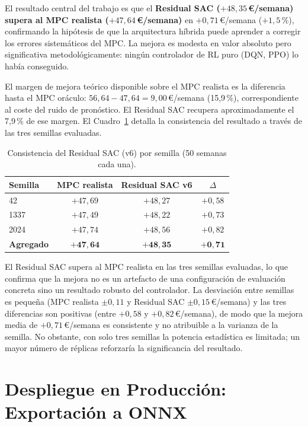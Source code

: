 \documentclass[12pt, a4paper, twoside]{report}
\begin{document}
El resultado central del trabajo es que el \textbf{Residual SAC
($+48{,}35$\,€/semana) supera al MPC realista ($+47{,}64$\,€/semana)} en
$+0{,}71$\,€/semana ($+1{,}5\,\%$), confirmando la hipótesis de que la
arquitectura híbrida
puede aprender a corregir los errores sistemáticos del MPC. La mejora es
modesta en valor absoluto pero significativa metodológicamente: ningún
controlador de RL puro (DQN, PPO) lo había conseguido.

El margen de mejora teórico disponible sobre el MPC realista es la diferencia
hasta el MPC oráculo: $56{,}64 - 47{,}64 = 9{,}00$\,€/semana (15{,}9\,\%),
correspondiente al coste del ruido de pronóstico. El Residual SAC recupera
aproximadamente el 7{,}9\,\% de ese margen. El Cuadro~\ref{tab:seeds} detalla la
consistencia del resultado a través de las tres semillas evaluadas.

\begin{table}[H]
\centering
\caption{Consistencia del Residual SAC (v6) por semilla (50 semanas cada una).}
\label{tab:seeds}
\begin{tabular}{lccc}
\toprule
\textbf{Semilla} & \textbf{MPC realista} & \textbf{Residual SAC v6} &
\textbf{$\Delta$} \\
\midrule
42 & $+47{,}69$ & $+48{,}27$ & $+0{,}58$ \\
1337 & $+47{,}49$ & $+48{,}22$ & $+0{,}73$ \\
2024 & $+47{,}74$ & $+48{,}56$ & $+0{,}82$ \\
\midrule
\textbf{Agregado} & $\mathbf{+47{,}64}$ & $\mathbf{+48{,}35}$ &
$\mathbf{+0{,}71}$ \\
\bottomrule
\end{tabular}
\end{table}

El Residual SAC supera al MPC realista en las tres semillas evaluadas, lo que
confirma que la mejora no es un artefacto de una configuración de evaluación
concreta sino un resultado robusto del controlador. La desviación entre semillas
es pequeña (MPC realista $\pm0{,}11$ y Residual SAC $\pm0{,}15$\,€/semana) y las
tres diferencias son positivas (entre $+0{,}58$ y $+0{,}82$\,€/semana), de modo
que la mejora media de $+0{,}71$\,€/semana es consistente y no atribuible a la
varianza de la semilla. No obstante, con solo tres semillas la potencia
estadística es limitada; un mayor número de réplicas reforzaría la significancia
del resultado.

\section{Despliegue en Producción: Exportación a ONNX}
\label{sec:onnx}
\end{document}
